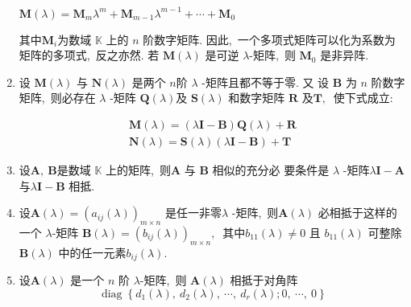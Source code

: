 \begin{enumerate}
		$\boldsymbol{M}(\lambda)=\boldsymbol{M}_{m} \lambda^{m}+\boldsymbol{M}_{m-1} \lambda^{m-1}+\cdots+\boldsymbol{M}_{0}$
		
		其中$  \boldsymbol{M}_{i}  $为数域  $\mathbb{K} $ 上的  $n$  阶数字矩阵. 因此,\  一个多项式矩阵可以化为系数为矩阵的多项式,\  反之亦然.
		若  $\boldsymbol{M}(\lambda)$  是可逆  $\lambda $-矩阵,\  则 $ \boldsymbol{M}_{0}$ 是非异阵.
		\item 设 $ \boldsymbol{M}(\lambda) $ 与  $\boldsymbol{N}(\lambda)$  是两个  $n  $阶  $\lambda$ -矩阵且都不等于零. 又 设  $\boldsymbol{B}$  为  $n $ 阶数字矩阵,\  则必存在 $ \lambda$ -矩阵 $ \boldsymbol{Q}(\lambda)  $及  $\boldsymbol{S}(\lambda)$  和数字矩阵 $\boldsymbol{R}$  及$  \boldsymbol{T} ,\ $ 使下式成立:
		
		$$\begin{array}{c}
			\boldsymbol{M}(\lambda)=(\lambda \boldsymbol{I}-\boldsymbol{B}) \boldsymbol{Q}(\lambda)+\boldsymbol{R} \\
			\boldsymbol{N}(\lambda)=\boldsymbol{S}(\lambda)(\lambda \boldsymbol{I}-\boldsymbol{B})+\boldsymbol{T}
		\end{array}$$
		
		\item 设$  \boldsymbol{A},\  \boldsymbol{B}  $是数域 $ \mathbb{K} $ 上的矩阵,\  则$  \boldsymbol{A} $ 与 $ \boldsymbol{B}$  相似的充分必 要条件是  $\lambda$ -矩阵$  \lambda \boldsymbol{I}-\boldsymbol{A}$ 与$  \lambda \boldsymbol{I}-\boldsymbol{B} $ 相抵.
		\item 设$  \boldsymbol{A}(\lambda)=\left(a_{i j}(\lambda)\right)_{m \times n} $ 是任一非零$  \lambda$ -矩阵,\  则$  \boldsymbol{A}(\lambda)$  必相抵于这样的一个 $ \lambda $-矩阵 $ \boldsymbol{B}(\lambda)=\left(b_{i j}(\lambda)\right)_{m \times n} ,\ $ 其中$  b_{11}(\lambda) \neq 0 $ 且  $b_{11}(\lambda) $ 可整除 $ \boldsymbol{B}(\lambda)$  中的任一元素$  b_{i j}(\lambda) .$
		\item 设$  \boldsymbol{A}(\lambda) $ 是一个 $ n $ 阶  $\lambda $-矩阵,\  则 $ \boldsymbol{A}(\lambda)$  相抵于对角阵
		$$\operatorname{diag}\left\{d_{1}(\lambda),\  d_{2}(\lambda),\  \cdots,\  d_{r}(\lambda) ; 0,\  \cdots,\  0\right\}$$
		

\end{enumerate}

